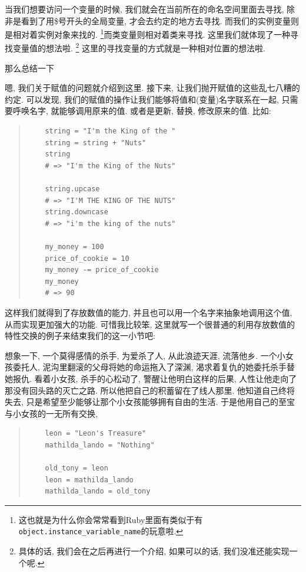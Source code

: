 当我们想要访问一个变量的时候, 我们就会在当前所在的命名空间里面去寻找, 除非是看到了用\$号开头的全局变量, 才会去约定的地方去寻找. 而我们的实例变量则是相对着实例对象来找的. \footnote{这也就是为什么你会常常看到Ruby里面有类似于有\texttt{object.instance_variable_name}的玩意啦. }而类变量则相对着类来寻找. 这里我们就体现了一种寻找变量值的想法啦. \footnote{具体的话, 我们会在之后再进行一个介绍, 如果可以的话, 我们没准还能实现一个呢. } 这里的寻找变量的方式就是一种相对位置的想法啦. 

那么总结一下

嗯, 我们关于赋值的问题就介绍到这里. 接下来, 让我们抛开赋值的这些乱七八糟的约定. 可以发现, 我们的赋值的操作让我们能够将值和(变量)名字联系在一起, 只需要呼唤名字, 就能够调用原来的值. 或者是更新, 替换, 修改原来的值. 比如: 

\begin{quotation}
  \begin{verbatim}
    string = "I'm the King of the "
    string = string + "Nuts"
    string
    # => "I'm the King of the Nuts"

    string.upcase
    # => "I'M THE KING OF THE NUTS"
    string.downcase
    # => "i'm the king of the nuts"

    my_money = 100
    price_of_cookie = 10
    my_money -= price_of_cookie
    my_money
    # => 90
  \end{verbatim}
\end{quotation}

这样我们就得到了存放数值的能力, 并且也可以用一个名字来抽象地调用这个值, 从而实现更加强大的功能. 可惜我比较笨, 这里就写一个很普通的利用存放数值的特性交换的例子来结束我们的这一小节吧: 

想象一下, 一个莫得感情的杀手, 为爱杀了人, 从此浪迹天涯, 流落他乡. 一个小女孩委托人, 泥沟里翻滚的父母将她的命运拖入了深渊, 渴求着复仇的她委托杀手替她报仇. 看着小女孩, 杀手的心松动了, 警醒让他明白这样的后果, 人性让他走向了那没有回头路的灭亡之路. 所以他把自己的积蓄留在了线人那里. 他知道自己终将失去, 只是希望至少能够让那个小女孩能够拥有自由的生活. 于是他用自己的至宝与小女孩的一无所有交换, 

\begin{quotation}
  \begin{verbatim}
    leon = "Leon's Treasure"
    mathilda_lando = "Nothing"

    old_tony = leon
    leon = mathilda_lando
    mathilda_lando = old_tony
  \end{verbatim}
\end{quotation}

